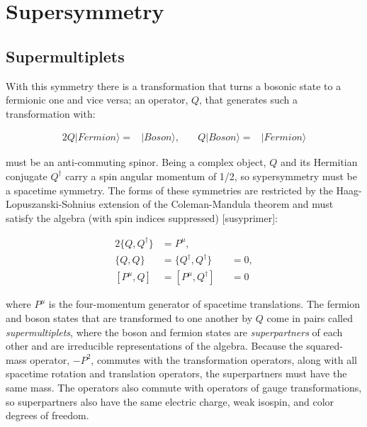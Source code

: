 
\section{Supersymmetry}

\subsection{Supermultiplets}

With this symmetry there is a transformation that turns a bosonic state to a fermionic one and vice versa; an operator, $Q$, that generates such a transformation with:

\begin{alignat}{2}
	Q|Fermion\rangle=&|Boson\rangle,\quad& Q|Boson\rangle=&|Fermion\rangle
\end{alignat}

must be an anti-commuting spinor.  Being a complex object, $Q$ and its Hermitian conjugate $Q^{\dagger}$ carry a spin angular momentum of 1/2, so sypersymmetry must be a spacetime symmetry.  The forms of these symmetries are restricted by the Haag-Lopuszanski-Sohnius extension of the Coleman-Mandula theorem and must satisfy the algebra (with spin indices suppressed) [susyprimer]:

\begin{alignat}{2}
	\{Q, Q^{\dagger}\} &= P^{\mu},\label{eq:QQDaggerOp}\\
	\{Q,Q\} &= \{Q^{\dagger}, Q^{\dagger}\} &&= 0,\label{eq:QQOp}\\
	[P^{\mu},Q] &= [P^{\mu},Q^{\dagger}] &&= 0\label{eq:PQOp}
\end{alignat}

where $P^{\mu}$ is the four-momentum generator of spacetime translations.  The fermion and boson states that are transformed to one another by $Q$ come in pairs called \textit{supermultiplets}, where the boson and fermion states are \textit{superpartners} of each other and are irreducible representations of the algebra.  Because the squared-mass operator, $-P^2$, commutes with the transformation operators, along with all spacetime rotation and translation operators, the superpartners must have the same mass.  The operators also commute with operators of gauge transformations, so superpartners also have the same electric charge, weak isospin, and color degrees of freedom.  \\

